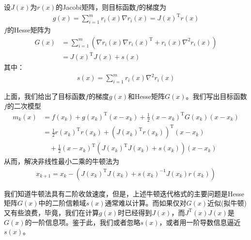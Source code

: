     \par
    设$J(x)$为$r(x)$的Jacobi矩阵，则目标函数$f$的梯度为
    \begin{align*}
     g(x)=\mathop {\sum}\limits_{i=1}^m r_i(x)\nabla r_i(x)=J(x)^\mathrm{T} r(x)
    \end{align*}
    $f$的Hesse矩阵为
    \begin{align*}
     G(x)&=\mathop {\sum}\limits_{i=1}^m (\nabla r_i(x)\nabla r_i(x)^\mathrm{T}  + r_i(x){\nabla}^2 r_i(x))\\
     &=J(x)^\mathrm{T} J(x)+s(x)
    \end{align*}
    其中：
    \begin{align*}
     s(x)=\mathop {\sum}\limits_{i=1}^m r_i(x){\nabla}^2 r_i(x)
    \end{align*}
    \par
    上面，我们给出了目标函数$f$的梯度$g(x)$和Hesse矩阵$G(x)$。我们写出目标函数$f$的二次模型
    \begin{align*}
     m_k(x)&=f(x_k)+g(x_k)^\mathrm{T} (x-x_k)+\frac 12 (x-x_k)^\mathrm{T} G(x_k)(x-x_k)\\
     &=\frac 12 r(x_k)^\mathrm{T} r(x_k)+(J(x_k)^\mathrm{T} r(x_k))^\mathrm{T} (x-x_k)\\
     &\quad +\frac 12(x-x_k)^\mathrm{T} (J(x_k)^\mathrm{T} J(x_k)+s(x_k))(x-x_k)
    \end{align*}
    从而，解决非线性最小二乘的牛顿法为
    \begin{align*}
     x_{k+1}=x_k-(J(x_k)^\mathrm{T} J(x_k)+s(x_k)^{-1}J(x_k)r(x_k))
    \end{align*}
    \par
    我们知道牛顿法具有二阶收敛速度，但是，上述牛顿迭代格式的主要问题是Hesse矩阵$G(x)$中的二阶信赖域$s(x)$通常难以计算。而如果仅对$G(x)$近似(拟牛顿)又有些浪费，毕竟，我们在计算$g(x)$时已经得到$J(x)$，而$J^\mathrm{T} (x)J(x)$是$G(x)$的一阶信息项。鉴于此，我们或者忽略$s(x)$，或者用一阶导数信息逼近$s(x)$。
